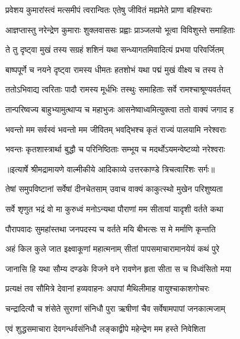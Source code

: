 \twolineshloka
{प्रवेशय कुमारांस्त्वं मत्समीपं त्वरान्वितः}
{एतेषु जीवितं मह्यमेते प्राणा बहिश्चराः} %

\twolineshloka
{आज्ञप्तास्तु नरेन्द्रेण कुमाराः शुक्लवाससः}
{प्रह्वाः प्राञ्जलयो भूत्वा विविशुस्ते समाहिताः} %

\twolineshloka
{ते तु दृष्ट्वा मुखं तस्य सग्रहं शशिनं यथा}
{सन्ध्यागतमिवादित्यं प्रभया परिवर्जितम्} %

\twolineshloka
{बाष्पपूर्णे च नयने दृष्ट्वा रामस्य धीमतः}
{हतशोभं यथा पद्मं मुखं वीक्ष्य च तस्य ते} %

\twolineshloka
{ततोऽभिवाद्य त्वरिताः पादौ रामस्य मूर्धभिः}
{तस्थुः समाहिताः सर्वे रामश्चाश्रूण्यवर्तयत्} %

\twolineshloka
{तान्परिष्वज्य बाहुभ्यामुत्थाप्य च महाभुजः}
{आसनेष्वाध्वमित्युक्त्वा ततो वाक्यं जगाद ह} %

\twolineshloka
{भवन्तो मम सर्वस्वं भवन्तो मम जीवितम्}
{भवद्भिश्च कृतं राज्यं पालयामि नरेश्वराः} %

\twolineshloka
{भवन्तः कृतशास्त्रार्था बुद्धौ च परिनिष्ठिताः}
{सम्भूय च मदर्थोऽयमन्वेष्टव्यो नरेश्वराः} %


{॥इत्यार्षे श्रीमद्रामायणे वाल्मीकीये आदिकाव्ये उत्तरकाण्डे त्रिचत्वारिंशः सर्गः॥}


\twolineshloka
{तेषां समुपविष्टानां सर्वेषां दीनचेतसाम्}
{उवाच वाक्यं काकुत्स्थो मुखेन परिशुष्यता} %

\twolineshloka
{सर्वे शृणुत भद्रं वो मा कुरुध्वं मनोऽन्यथा}
{पौराणां मम सीतायां यादृशी वर्तते कथा} %

\twolineshloka
{पौरापवादः सुमहांस्तथा जनपदस्य च}
{वर्तते मयि बीभत्सः स मे मर्माणि कृन्तति} %

\twolineshloka
{अहं किल कुले जात इक्ष्वाकूणां महात्मनाम्}
{सीतां पापसमाचारामानयेयं कथं पुरे} %

\twolineshloka
{जानासि हि यथा सौम्य दण्डके विजने वने}
{रावणेन हृता सीता स च विध्वंसितो मया} %

\twolineshloka
{प्रत्यक्षं तव सौमित्रे देवानां हव्यवाहनः}
{अपापां मैथिलीमाह वायुश्चाकाशगोचरः} %

\twolineshloka
{चन्द्रादित्यौ च शंसेते सुराणां संनिधौ पुरा}
{ऋषीणां चैव सर्वेषामपापां जनकात्मजाम्} %

\twolineshloka
{एवं शुद्धसमाचारा देवगन्धर्वसंनिधौ}
{लङ्काद्वीपे महेन्द्रेण मम हस्ते निवेशिता} %

